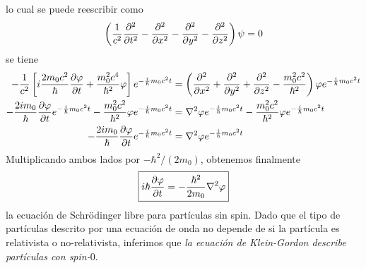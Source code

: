 lo cual se puede reescribir como
\begin{equation}
  \left(\frac{1}{c^2}\pdv[2]{t}-\pdv[2]{x}-\pdv[2]{y}-\pdv[2]{z}\right)\psi=0
\end{equation}
se tiene
\begin{align}
  -\frac{1}{c^2}\left[i\frac{2m_0c^2}{\hbar}\pdv{\varphi}{t}+\frac{m_0^2c^4}{\hbar^2}\varphi\right]e^{-\frac{i}{\hbar}m_0c^2t}&=\left(\pdv[2]{x}+\pdv[2]{y}+\pdv[2]{z}-\frac{m_0^2c^2}{\hbar^2}\right)\varphi e^{-\frac{i}{\hbar}m_0c^2t}\\
  -\frac{2im_0}{\hbar}\pdv{\varphi}{t}e^{-\frac{i}{\hbar}m_0c^2t}-\frac{m_0^2c^2}{\hbar^2}\varphi e^{-\frac{i}{\hbar}m_0c^2t}&=\nabla^2\varphi e^{-\frac{i}{\hbar}m_0c^2t}-\frac{m_0^2c^2}{\hbar^2}\varphi e^{-\frac{i}{\hbar}m_0c^2t}\\
  -\frac{2im_0}{\hbar}\pdv{\varphi}{t}e^{-\frac{i}{\hbar}m_0c^2t}&=\nabla^2\varphi e^{-\frac{i}{\hbar}m_0c^2t}
\end{align}
Multiplicando ambos lados por $-\hbar^2/(2m_0)$, obtenemos finalmente
\begin{equation}
\boxed{  i\hbar \pdv{\varphi}{t}=-\frac{\hbar^2}{2m_0}\nabla^2\varphi}
\end{equation}
la ecuación de Schrödinger libre para partículas sin spin. Dado que el tipo de partículas descrito por una ecuación de onda no depende de si la partícula es relativista o no-relativista, inferimos que \textit{la ecuación de Klein-Gordon describe partículas con spin-$0$}.

